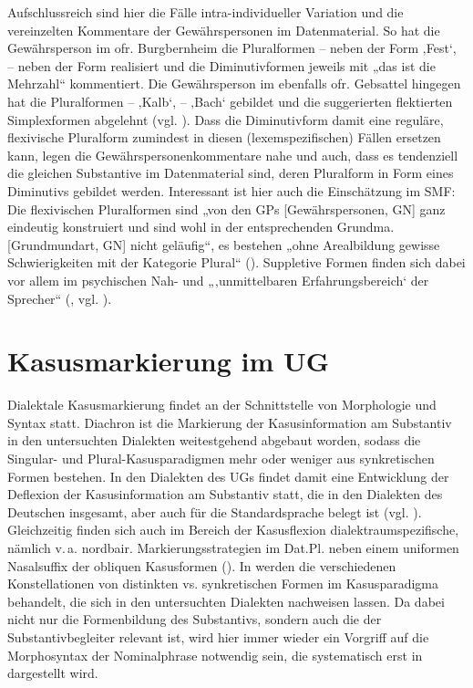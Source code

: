 Aufschlussreich sind hier die Fälle intra-individueller Variation und die vereinzelten Kommentare der Gewährspersonen im Datenmaterial. So hat die Gewährsperson im ofr. Burgbernheim die Pluralformen  --  neben der Form  ‚Fest‘,  --  neben der Form  realisiert und die Diminutivformen jeweils mit „das ist die Mehrzahl“ kommentiert. Die Gewährsperson im ebenfalls ofr. Gebsattel hingegen hat die Pluralformen  --  ‚Kalb‘,  --  ‚Bach‘ gebildet und die suggerierten flektierten Simplexformen abgelehnt (vgl. \citealt[29]{SMF7}). Dass die Diminutivform damit eine reguläre, flexivische Pluralform zumindest in diesen (lexemspezifischen) Fällen ersetzen kann, legen die Gewährspersonenkommentare nahe und auch, dass es tendenziell die gleichen Substantive im Datenmaterial sind, deren Pluralform in Form eines Diminutivs gebildet werden. Interessant ist hier auch die Einschätzung im SMF: Die flexivischen Pluralformen sind „von den GPs [Gewährspersonen, GN] ganz eindeutig konstruiert und sind wohl in der entsprechenden Grundma. [Grundmundart, GN] nicht geläufig“, es bestehen „ohne Arealbildung gewisse Schwierigkeiten mit der Kategorie Plural“ (\citealt[29]{SMF7}). Suppletive Formen finden sich dabei vor allem im psychischen Nah- und „‚unmittelbaren Erfahrungsbereich‘ der Sprecher“ (\citealt[57]{Harnisch1990}, vgl. \citealt[520]{Melcuk2000}).

\section{Kasusmarkierung im UG}
\label{sec:7.2}
Dialektale Kasusmarkierung findet an der Schnittstelle von Morphologie und Syntax statt. Diachron ist die Markierung der Kasusinformation am Substantiv in den untersuchten Dialekten weitestgehend abgebaut worden, sodass die Singular- und Plural-Kasusparadigmen mehr oder weniger aus synkretischen Formen bestehen. In den Dialekten des UGs findet damit eine Entwicklung der Deflexion der Kasusinformation am Substantiv statt, die in den Dialekten des Deutschen insgesamt, aber auch für die Standardsprache belegt ist (vgl. ). Gleichzeitig finden sich auch im Bereich der Kasusflexion dialektraumspezifische, nämlich v.\,a. nordbair. Markierungsstrategien im Dat.Pl. neben einem uniformen Nasalsuffix der obliquen Kasusformen (). In  werden die verschiedenen Konstellationen von distinkten vs. synkretischen Formen im Kasusparadigma behandelt, die sich in den untersuchten Dialekten nachweisen lassen. Da dabei nicht nur die Formenbildung des Substantivs, sondern auch die der Substantivbegleiter relevant ist, wird hier immer wieder ein Vorgriff auf die Morphosyntax der Nominalphrase notwendig sein, die systematisch erst in  dargestellt wird.\largerpage

